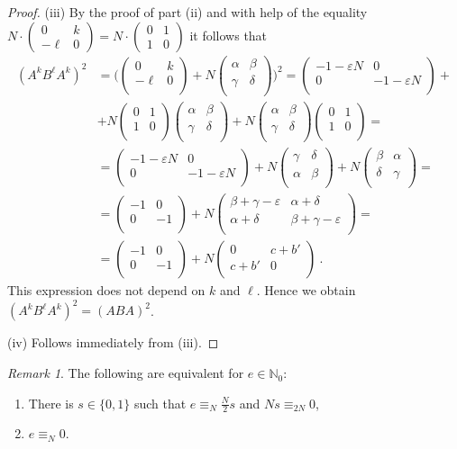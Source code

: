 \documentclass[10pt]{amsart}
\theoremstyle{plain}
\theoremstyle{definition}
\theoremstyle{remark}%
\newtheorem{remark}[theorem]{Remark}
\newcommand{\N}{\mathbb{N}}
\newcommand{\mat}[4]{\left(\begin{array}{cc}
 #1 & #2\\
 #3 & #4\\
\end{array}\right)}
\begin{document}
\begin{proof}
 (iii) By the proof of part (ii) and  with help of the equality $N\cdot(\begin{smallmatrix}0 & k\\ -\ell & 0\end{smallmatrix})=N\cdot(\begin{smallmatrix}0 & 1\\ 1 & 0\end{smallmatrix})$ it follows that 
 \begin{align*}
 (A^k B^{\ell}A^k)^2&=\Bigg(\mat{0}{k}{-\ell}{0}+
 N\mat{\alpha}{\beta}{\gamma}{\delta}\Bigg)^2=\mat{-1-\varepsilon N}{0}{0}{-1-\varepsilon N}+\\
 &+N\mat{0}{1}{1}{0}\mat{\alpha}{\beta}{\gamma}{\delta}+N\mat{\alpha}{\beta}{\gamma}{\delta}\mat{0}{1}{1}{0}=\\
 &=\mat{-1-\varepsilon N}{0}{0}{-1-\varepsilon N}+N\mat{\gamma}{\delta}{\alpha}{\beta}+N\mat{\beta}{\alpha}{\delta}{\gamma}=\\
 &=\mat{-1}{0}{0}{-1}+N\mat{\beta+\gamma-\varepsilon}{\alpha+\delta}{\alpha+\delta}{\beta+\gamma-\varepsilon}=\\
 &=\mat{-1}{0}{0}{-1}+
 N\mat{0}{c+b'}{c+b'}{0}\ .
 \end{align*}
 This expression does not depend on $k$ and $\ell$. Hence we obtain $(A^{k}B^{\ell}A^k)^2=(ABA)^2$.
 
 (iv) Follows immediately from (iii).
\end{proof}

\begin{remark}\label{10.3}
 The following are equivalent for $e\in\N_0$:
 \begin{enumerate}
  \item There is $s\in\{0,1\}$ such that $e\equiv_{N}\frac{N}{2}s$ and $Ns\equiv_{2N}0$,
  \item $e\equiv_{N}0$.
 \end{enumerate}
\end{remark}
\end{document}
